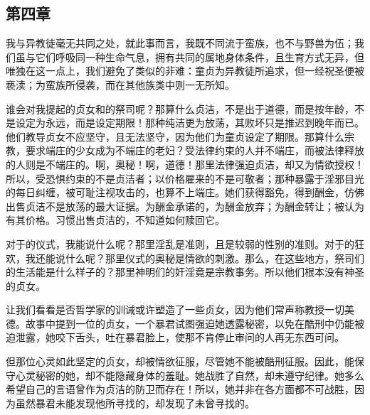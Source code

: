 
\subsection{第四章}

\par

我与异教徒毫无共同之处，就此事而言，我既不同流于蛮族，也不与野兽为伍；我们虽与它们呼吸同一种生命气息，拥有共同的属地身体条件，且生育方式无异，但唯独在这一点上，我们避免了类似的非难：童贞为异教徒所追求，但一经祝圣便被亵渎；为蛮族所侵袭，而在其他族类中则一无所知。\par

谁会对我提起的贞女和的祭司呢？那算什么贞洁，不是出于道德，而是按年龄，不是设定为永远，而是设定期限！那种纯洁更为放荡，其败坏只是推迟到晚年而已。他们教导贞女不应坚守，且无法坚守，因为他们为童贞设定了期限。那算什么宗教，要求端庄的少女成为不端庄的老妇？受法律约束的人并不端庄，而被法律释放的人则是不端庄的。啊，奥秘！啊，道德！那里法律强迫贞洁，却又为情欲授权！所以，受恐惧约束的不是贞洁者；以价格雇来的不是可敬者；那种暴露于淫邪目光的每日纠缠，被可耻注视攻击的，也算不上端庄。她们获得豁免，得到酬金，仿佛出售贞洁不是放荡的最大证据。为酬金承诺的，为酬金放弃；为酬金转让；被认为有其价格。习惯出售贞洁的，不知道如何赎回它。\par

对于的仪式，我能说什么呢？那里淫乱是准则，且是较弱的性别的准则。对于的狂欢，我还能说什么呢？那里仪式的奥秘是情欲的刺激。那么，在这些地方，祭司们的生活能是什么样子的？那里神明们的奸淫竟是宗教事务。所以他们根本没有神圣的贞女。\par

让我们看看是否哲学家的训诫或许塑造了一些贞女，因为他们常声称教授一切美德。故事中提到一位的贞女，一个暴君试图强迫她透露秘密，以免在酷刑中仍能被迫泄露，她咬下舌头，吐在暴君脸上，使那不肯停止审问的人再无东西可问。\par

但那位心灵如此坚定的贞女，却被情欲征服，尽管她不能被酷刑征服。因此，能保守心灵秘密的她，却不能隐藏身体的羞耻。她战胜了自然，却未遵守纪律。她多么希望自己的言语曾作为贞洁的防卫而存在！所以，她并非在各方面都不可战胜，因为虽然暴君未能发现他所寻找的，却发现了未曾寻找的。\par


